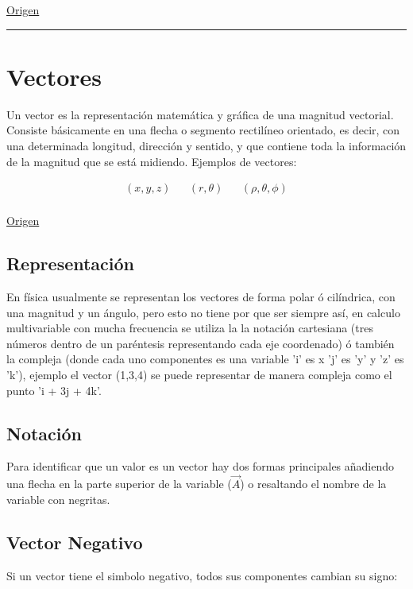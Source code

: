 \documentclass{article}
\begin{document}
\href{https://temasdecalculo.com/2017/12/18/4-14-coordenadas-cilindricas-y-coordenadas-esfericas-calculo-vectorial/}{Origen}

\noindent\rule{\textwidth}{0.5pt}

\section{Vectores}
\label{sec:org3178ace}
Un vector es la representación matemática y gráfica de una magnitud vectorial. Consiste básicamente en una flecha o segmento rectilíneo orientado, es decir, con una determinada longitud, dirección y sentido, y que contiene toda la información de la magnitud que se está midiendo. Ejemplos de vectores: 

\[\begin{aligned}
  (x,y,z) && (r,\theta) && (\rho, \theta, \phi) \\
\end{aligned}\] 

\href{https://ingemecanica.com/tutoriales/calculo\_vectorial.html}{Origen}

\subsection{Representación}
\label{sec:org1720e6d}
En física usualmente se representan los vectores de forma polar ó cilíndrica, con una magnitud y un ángulo, pero esto no tiene por que ser siempre así, en calculo multivariable con mucha frecuencia se utiliza la la notación cartesiana (tres números dentro de un paréntesis representando cada eje coordenado) ó también la compleja (donde cada uno componentes es una variable 'i' es x 'j' es 'y' y 'z' es 'k'), ejemplo el vector (1,3,4) se puede representar de manera compleja como el punto 'i + 3j + 4k'. 

\subsection{Notación}
\label{sec:org367cb2e}
Para identificar que un valor es un vector hay dos formas principales añadiendo una flecha en la parte superior de la variable (\(\vec{A}\)) o resaltando el nombre de la variable con negritas. 

\subsection{Vector Negativo}
\label{sec:org2582ba6}
Si un vector tiene el simbolo negativo, todos sus componentes cambian su signo: 
\end{document}
